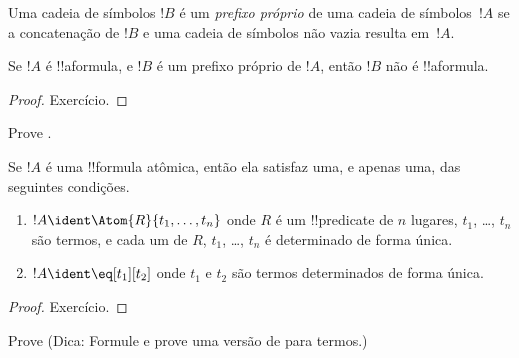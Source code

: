 \documentclass[../../../include/open-logic-section]{subfiles}
\begin{document}
\begin{defn}
Uma cadeia de símbolos $!B$ é um \emph{prefixo próprio} de uma cadeia de símbolos~$!A$ se
a concatenação de $!B$ e uma cadeia de símbolos não vazia resulta em~$!A$.
\end{defn}

\begin{lem}
Se $!A$ é !!a{formula}, e $!B$ é um prefixo próprio de $!A$, então
$!B$ não é !!a{formula}.
\end{lem}

\begin{proof}
Exercício.
\end{proof}

\begin{prob}
Prove .
\end{prob}

\begin{prop}
Se $!A$ é uma !!{formula} atômica, então ela satisfaz uma, e apenas uma,
das seguintes condições.
\begin{enumerate}
\item $!A \ident \Atom{R}{t_1,\dots,t_n}$ onde $R$ é um !!{predicate}
  de $n$ lugares, $t_1$, \dots, $t_n$ são termos, e cada um de $R$,
  $t_1$, \dots, $t_n$ é determinado de forma única.
\item $!A \ident \eq[t_1][t_2]$ onde $t_1$ e $t_2$ são termos
  determinados de forma única.
\end{enumerate}
\end{prop}

\begin{proof}
Exercício.
\end{proof}

\begin{prob}
Prove  (Dica: Formule e
prove uma versão de  para termos.)
\end{prob}
\end{document}
